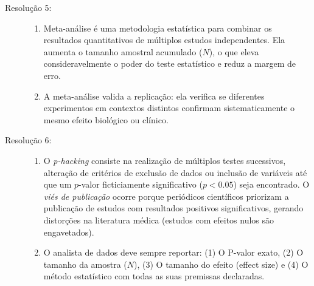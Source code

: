 \documentclass[12pt]{article}
\begin{document}
\begin{description}
    \item[Resolução 5:] 
    \begin{enumerate}[label=\alph*)]
        \item Meta-análise é uma metodologia estatística para combinar os resultados quantitativos de múltiplos estudos independentes. Ela aumenta o tamanho amostral acumulado ($N$), o que eleva consideravelmente o poder do teste estatístico e reduz a margem de erro.
        \item A meta-análise valida a replicação: ela verifica se diferentes experimentos em contextos distintos confirmam sistematicamente o mesmo efeito biológico ou clínico.
    \end{enumerate}

    \item[Resolução 6:] 
    \begin{enumerate}[label=\alph*)]
        \item O \textit{p-hacking} consiste na realização de múltiplos testes sucessivos, alteração de critérios de exclusão de dados ou inclusão de variáveis até que um $p$-valor ficticiamente significativo ($p < 0.05$) seja encontrado. O \textit{viés de publicação} ocorre porque periódicos científicos priorizam a publicação de estudos com resultados positivos significativos, gerando distorções na literatura médica (estudos com efeitos nulos são engavetados).
        \item O analista de dados deve sempre reportar: (1) O P-valor exato, (2) O tamanho da amostra ($N$), (3) O tamanho do efeito (effect size) e (4) O método estatístico com todas as suas premissas declaradas.
    \end{enumerate}
\end{description}
\end{document}
